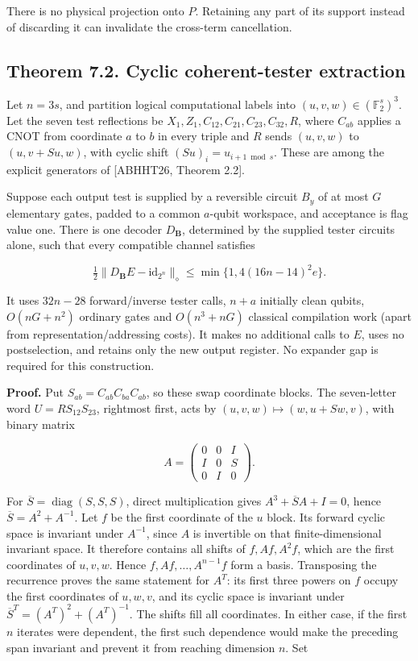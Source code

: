 \documentclass[11pt]{article}
\begin{document}
There is no physical projection onto \(P\). Retaining any part of its
support instead of discarding it can invalidate the cross-term cancellation.

\subsection*{Theorem 7.2. Cyclic coherent-tester extraction}

Let \(n=3s\), and partition logical computational labels into
\((u,v,w)\in(\mathbb F_2^s)^3\). Let the seven test reflections be
\(X_1,Z_1,C_{12},C_{21},C_{23},C_{32},R\), where \(C_{ab}\) applies a
CNOT from coordinate \(a\) to \(b\) in every triple and \(R\) sends
\((u,v,w)\) to \((u,v+Su,w)\), with cyclic shift
\((Su)_i=u_{i+1\bmod s}\). These are among the explicit generators of
[ABHHT26, Theorem 2.2].

Suppose each output test is supplied by a reversible circuit \(B_y\) of at
most \(G\) elementary gates, padded to a common \(a\)-qubit workspace,
and acceptance is flag value one. There is one decoder \(D_{\mathbf B}\),
determined by the supplied tester circuits alone, such that every compatible
channel satisfies

\[
\tfrac12\|D_{\mathbf B}E-\mathrm{id}_{2^n}\|_\diamond
\le\min\{1,4(16n-14)^2e\}.
\tag{7.2}
\]

It uses \(32n-28\) forward/inverse tester calls, \(n+a\) initially clean
qubits, \(O(nG+n^2)\) ordinary gates and \(O(n^3+nG)\) classical
compilation work (apart from representation/addressing costs). It makes no
additional calls to \(E\), uses no postselection, and retains only the new
output register. No expander gap is required for this construction.

\textbf{Proof.} Put \(S_{ab}=C_{ab}C_{ba}C_{ab}\), so these swap coordinate
blocks. The seven-letter word \(U=RS_{12}S_{23}\), rightmost first,
acts by \((u,v,w)\mapsto(w,u+Sw,v)\), with binary matrix

\[
A=\begin{pmatrix}0&0&I\\I&0&S\\0&I&0\end{pmatrix}.
\]

For \(\overline S=\operatorname{diag}(S,S,S)\), direct multiplication gives
\(A^3+\overline SA+I=0\), hence \(\overline S=A^2+A^{-1}\).
Let \(f\) be the first coordinate of the \(u\) block. Its forward cyclic
space is invariant under \(A^{-1}\), since \(A\) is invertible on that
finite-dimensional invariant space. It therefore contains all shifts of
\(f,Af,A^2f\), which are the first coordinates of \(u,v,w\). Hence
\(f,Af,\ldots,A^{n-1}f\) form a basis. Transposing the recurrence proves
the same statement for \(A^T\): its first three powers on \(f\) occupy the
first coordinates of \(u,w,v\), and its cyclic space is invariant under
\(\overline S^T=(A^T)^2+(A^T)^{-1}\). The shifts fill all coordinates.
In either case, if the first \(n\) iterates were dependent, the first such
dependence would make the preceding span invariant and prevent it from
reaching dimension \(n\). Set
\end{document}
